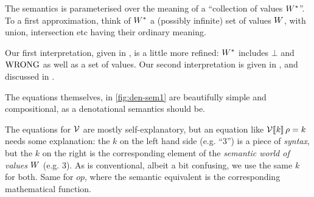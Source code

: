 The semantics is parameterised over the meaning of a ``collection of values $W^{*}$''.
To a first approximation, think of $W^{*}$ a (possibly infinite) set of values $W$,
with union, intersection etc having their ordinary meaning.

Our first interpretation,
given in , is a little more refined: $W^{*}$ includes $\bot$ and $\mathrm{WRONG}$ as
well as a set of values.  Our second interpretation is given in , and
discussed in .

The equations themselves, in \cref{fig:den-sem1}
are beautifully simple and compositional, as a denotational semantics should be.

The equations for $\mathcal{V}$ are mostly self-explanatory, but an equation like $\mathcal{V}\llbracket \mathit{k} \rrbracket\, \rho = k$ needs some
explanation: the $k$ on the left hand side (e.g. ``\ensuremath{\mathrm{3}}'') is a piece of \emph{syntax}, but the $k$ on the right is the corresponding
element of the \emph{semantic world of values} $W$ (e.g. $3$). As is conventional, albeit a bit confusing,
we use the same $k$ for both.  Same for $op$, where the semantic equivalent is the corresponding mathematical function.

